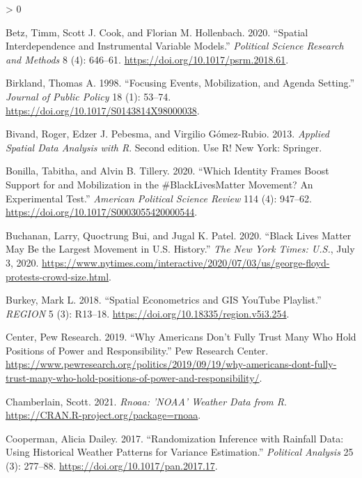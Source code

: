 \documentclass[
  12pt,
]{article}
\newlength{\cslhangindent}
\newenvironment{CSLReferences}[2] %
 {%
  \setlength{\parindent}{0pt}
  \ifodd #1 \everypar{\setlength{\hangindent}{\cslhangindent}}\ignorespaces\fi
  \ifnum #2 > 0
  \setlength{\parskip}{#2\baselineskip}
  \fi
 }%
 {}
\begin{document}
\hypertarget{refs}{}
\begin{CSLReferences}{1}{0}
\leavevmode\hypertarget{ref-Betz2020}{}%
Betz, Timm, Scott J. Cook, and Florian M. Hollenbach. 2020. {``Spatial Interdependence and Instrumental Variable Models.''} \emph{Political Science Research and Methods} 8 (4): 646--61. \url{https://doi.org/10.1017/psrm.2018.61}.

\leavevmode\hypertarget{ref-Birkland1998}{}%
Birkland, Thomas A. 1998. {``Focusing {Events}, {Mobilization}, and {Agenda Setting}.''} \emph{Journal of Public Policy} 18 (1): 53--74. \url{https://doi.org/10.1017/S0143814X98000038}.

\leavevmode\hypertarget{ref-Bivand2013}{}%
Bivand, Roger, Edzer J. Pebesma, and Virgilio Gómez-Rubio. 2013. \emph{Applied Spatial Data Analysis with {R}}. Second edition. Use {R}! {New York}: {Springer}.

\leavevmode\hypertarget{ref-Bonilla2020}{}%
Bonilla, Tabitha, and Alvin B. Tillery. 2020. {``Which {Identity Frames Boost Support} for and {Mobilization} in the \#{BlackLivesMatter Movement}? {An Experimental Test}.''} \emph{American Political Science Review} 114 (4): 947--62. \url{https://doi.org/10.1017/S0003055420000544}.

\leavevmode\hypertarget{ref-Buchanan2020}{}%
Buchanan, Larry, Quoctrung Bui, and Jugal K. Patel. 2020. {``Black {Lives Matter May Be} the {Largest Movement} in {U}.{S}. {History}.''} \emph{The New York Times: U.S.}, July 3, 2020. \url{https://www.nytimes.com/interactive/2020/07/03/us/george-floyd-protests-crowd-size.html}.

\leavevmode\hypertarget{ref-Burkey2018}{}%
Burkey, Mark L. 2018. {``Spatial {Econometrics} and {GIS YouTube Playlist}.''} \emph{REGION} 5 (3): R13--18. \url{https://doi.org/10.18335/region.v5i3.254}.

\leavevmode\hypertarget{ref-PewResearchCenter2019}{}%
Center, Pew Research. 2019. {``Why {Americans Don}'t {Fully Trust Many Who Hold Positions} of {Power} and {Responsibility}.''} {Pew Research Center}. \url{https://www.pewresearch.org/politics/2019/09/19/why-americans-dont-fully-trust-many-who-hold-positions-of-power-and-responsibility/}.

\leavevmode\hypertarget{ref-Chamberlain2021}{}%
Chamberlain, Scott. 2021. \emph{Rnoaa: '{NOAA}' {Weather Data} from {R}}. \url{https://CRAN.R-project.org/package=rnoaa}.

\leavevmode\hypertarget{ref-Cooperman2017}{}%
Cooperman, Alicia Dailey. 2017. {``Randomization {Inference} with {Rainfall Data}: {Using Historical Weather Patterns} for {Variance Estimation}.''} \emph{Political Analysis} 25 (3): 277--88. \url{https://doi.org/10.1017/pan.2017.17}.


\end{CSLReferences}
\end{document}
